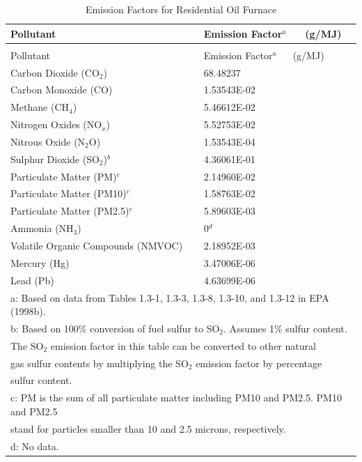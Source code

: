 \begin{longtable}[c]{p{4.5in}p{1.5in}}
\caption{Emission Factors for Residential Oil Furnace \label{table:emission-factors-for-residential-oil-furnace}} \tabularnewline
\toprule 
Pollutant & Emission Factor\(^a\)  ~~ (g/MJ) \tabularnewline
\midrule
\endfirsthead

\caption[]{Emission Factors for Residential Oil Furnace} \tabularnewline
\toprule 
Pollutant & Emission Factor\(^a\)  ~~ (g/MJ) \tabularnewline
\midrule
\endhead

Carbon Dioxide (CO\(_2\)) & 68.48237 \tabularnewline
Carbon Monoxide (CO) & 1.53543E-02 \tabularnewline
Methane (CH\(_4\)) & 5.46612E-02 \tabularnewline
Nitrogen Oxides (NO\(_x\)) & 5.52753E-02 \tabularnewline
Nitrous Oxide (N\(_2\)O) & 1.53543E-04 \tabularnewline
Sulphur Dioxide (SO\(_2\))\(^b\) & 4.36061E-01 \tabularnewline
Particulate Matter (PM)\(^c\) & 2.14960E-02 \tabularnewline
Particulate Matter (PM10)\(^c\) & 1.58763E-02 \tabularnewline
Particulate Matter (PM2.5)\(^c\) & 5.89603E-03 \tabularnewline
Ammonia (NH\(_3\)) & 0\(^d\) \tabularnewline
Volatile Organic Compounds (NMVOC) & 2.18952E-03 \tabularnewline
Mercury (Hg) & 3.47006E-06 \tabularnewline
Lead (Pb) & 4.63699E-06 \tabularnewline
\midrule
\multicolumn{2}{l}{a: Based on data from Tables 1.3-1, 1.3-3, 1.3-8, 1.3-10, and 1.3-12 in EPA (1998b).} \tabularnewline
\multicolumn{2}{l}{b: Based on 100\% conversion of fuel sulfur to SO\(_2\). Assumes 1\% sulfur content.} \tabularnewline
\multicolumn{2}{l}{The SO\(_2\) emission factor in this table can be converted to other natural} \tabularnewline
\multicolumn{2}{l}{gas sulfur contents by multiplying the SO\(_2\) emission factor by percentage} \tabularnewline
\multicolumn{2}{l}{sulfur content.} \tabularnewline
\multicolumn{2}{l}{c: PM is the sum of all particulate matter including PM10 and PM2.5. PM10 and PM2.5} \tabularnewline
\multicolumn{2}{l}{stand for particles smaller than 10 and 2.5 microns, respectively.} \tabularnewline
\multicolumn{2}{l}{d: No data.} \tabularnewline
\bottomrule
\end{longtable}


